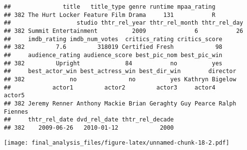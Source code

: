 \documentclass[]{article}
\newenvironment{Shaded}{\begin{snugshade}}{\end{snugshade}}
\newcommand{\KeywordTok}[1]{\textcolor[rgb]{0.13,0.29,0.53}{\textbf{#1}}}
\newcommand{\DataTypeTok}[1]{\textcolor[rgb]{0.13,0.29,0.53}{#1}}
\newcommand{\StringTok}[1]{\textcolor[rgb]{0.31,0.60,0.02}{#1}}
\newcommand{\OperatorTok}[1]{\textcolor[rgb]{0.81,0.36,0.00}{\textbf{#1}}}
\newcommand{\NormalTok}[1]{#1}
\begin{document}
\begin{verbatim}
##               title   title_type genre runtime mpaa_rating
## 382 The Hurt Locker Feature Film Drama     131           R
##                   studio thtr_rel_year thtr_rel_month thtr_rel_day
## 382 Summit Entertainment          2009              6           26
##     imdb_rating imdb_num_votes  critics_rating critics_score
## 382         7.6         318019 Certified Fresh            98
##     audience_rating audience_score best_pic_nom best_pic_win
## 382         Upright             84           no          yes
##     best_actor_win best_actress_win best_dir_win        director
## 382             no               no          yes Kathryn Bigelow
##            actor1         actor2         actor3     actor4        actor5
## 382 Jeremy Renner Anthony Mackie Brian Geraghty Guy Pearce Ralph Fiennes
##     thtr_rel_date dvd_rel_date thtr_rel_decade
## 382    2009-06-26   2010-01-12            2000
\end{verbatim}

\begin{Shaded}
\end{Shaded}

\texttt{[image: final\_analysis\_files/figure-latex/unnamed-chunk-18-2.pdf]}

\begin{Shaded}
\end{Shaded}
\end{document}
